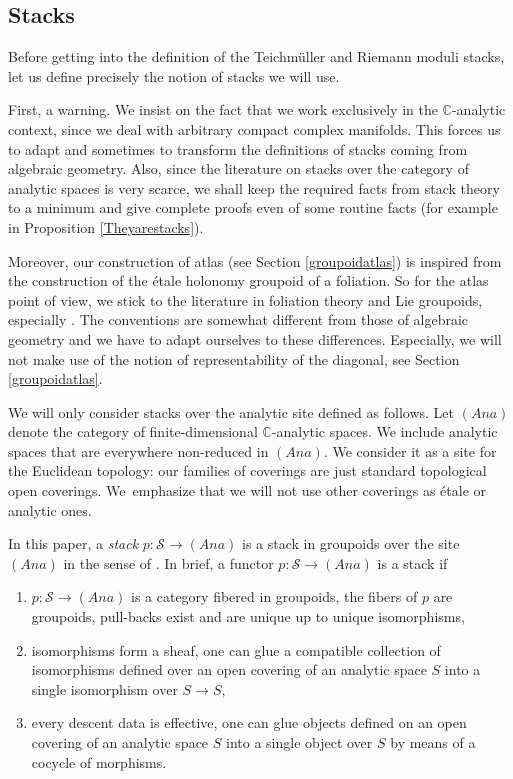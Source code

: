 \documentclass[JEP,XML,SOM,Unicode]{cedram}
\let\mathcal\mathscr
\newcommand{\Ana}{\mathit{Ana}}
\theoremstyle{plain}
\theoremstyle{definition}
\theoremstyle{remark}
\numberwithin{equation}{section}
\newcommand{\CC}{{\mathbb{C}}}
\begin{document}
\subsection{Stacks}
\label{stacksgroupoids}
Before getting into the definition of the Teichmüller and Riemann moduli stacks, let us define precisely the notion of stacks we will use.

First, a warning. We insist on the fact that we work exclusively in the $\CC$-analytic context, since we deal with arbitrary compact complex
manifolds. This forces us to adapt and sometimes to transform the definitions of stacks coming from algebraic geometry. Also, since the literature on stacks over the category of analytic spaces is very scarce, we shall keep the required facts from stack theory to a minimum and give complete proofs even of some routine facts (for example in Proposition \ref{Theyarestacks}).

Moreover, our construction of atlas (see Section \ref{groupoidatlas}) is inspired from the construction of the étale holonomy groupoid of a foliation. So for the atlas point of view, we stick to the literature in foliation theory and Lie groupoids, especially \cite{Moerdijk}. The conventions are somewhat different from those of algebraic geometry and we have to adapt ourselves to these differences. Especially, we will not make use of the notion of representability of the diagonal, see Section \ref{groupoidatlas}.

We will only consider stacks over the analytic site defined as follows. Let $(\Ana)$ \hbox{denote} the category of finite-dimensional $\CC$-analytic spaces. We include analytic spaces that are everywhere non-reduced in $(\Ana)$. We consider it as a site for the \hbox{Euclidean} topology: our families of coverings are just standard topological open coverings. We~emphasize that we will not use other coverings as étale or analytic ones.

In this paper, a \emph{stack} $p:\mathcal S\to (\Ana)$ is a stack in groupoids over the site $(\Ana)$ in the sense of \cite[Def.\,8.5.1]{Stacksproject}.
In brief, a functor $p:\mathcal S\to (\Ana)$ is a stack if
\begin{enumerate}
\item
$p:\mathcal S\to(\Ana)$ is a category fibered in groupoids, \ie the fibers of $p$ are groupoids, pull-backs exist and are unique up to unique isomorphisms,
\item
isomorphisms form a sheaf, \ie one can glue a compatible collection of isomorphisms defined over an open covering of an analytic space $S$ into a single isomorphism over $S\to S$,
\item
every descent data is effective, \ie one can glue objects defined on an open covering of an analytic space $S$ into a single object over $S$ by means of a cocycle of morphisms.
\end{enumerate}
\end{document}
